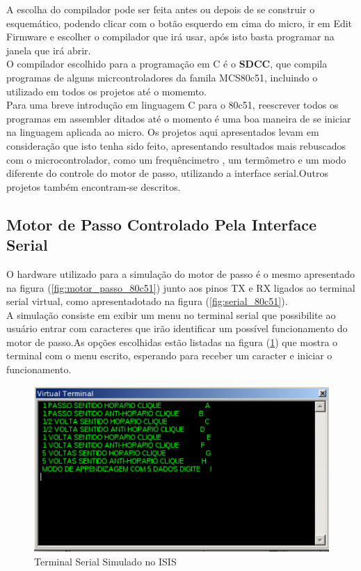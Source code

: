 \documentclass{Fabiano_file}
\begin{document}
{A escolha do compilador pode ser feita antes ou depois de se construir o esquemático, podendo clicar com o botão esquerdo em cima do micro, ir em Edit Firmware
e escolher o compilador que irá usar, após isto basta programar na janela que irá abrir.\\

O compilador escolhido para a programação em C é o \textbf{SDCC}, que compila programas de alguns micrcontroladores da famila MCS80c51, incluindo o utilizado em 
todos os projetos até o momemto.\\

Para uma breve introdução em linguagem C para o 80c51, reescrever todos os programas em assembler ditados até o momento é uma boa maneira de se iniciar na linguagem aplicada ao micro.
Os projetos aqui apresentados levam em consideração que isto tenha sido feito, apresentando resultados mais rebuscados com o microcontrolador, como um frequêncimetro
, um termômetro e um modo diferente do controle do motor de passo, utilizando a interface serial.Outros projetos também encontram-se descritos.\\

\subsection{Motor de Passo Controlado Pela Interface Serial}
O hardware utilizado para a simulação do motor de passo é o mesmo apresentado na figura (\ref{fig:motor_passo_80c51}) junto aos pinos TX e RX ligados 
ao terminal serial virtual, como apresentadotado na figura (\ref{fig:serial_80c51}).\\
A simulação consiste em exibir um menu no terminal serial que possibilite ao usuário entrar com caracteres que irão identificar um possível funcionamento 
do motor de passo.As opções escolhidas estão listadas na figura (\ref{fig:terminal_serial_motor_de_passo}) que mostra o terminal com o menu escrito, 
esperando para receber um caracter e iniciar o funcionamento.\\

\begin{figure}[h!]
\centering
\includegraphics[width=.7\textwidth]{terminal_serial_motor_de_passo.pdf}
\caption{Terminal Serial Simulado no ISIS}
\label{fig:terminal_serial_motor_de_passo}
\end{figure}

}
\end{document}
